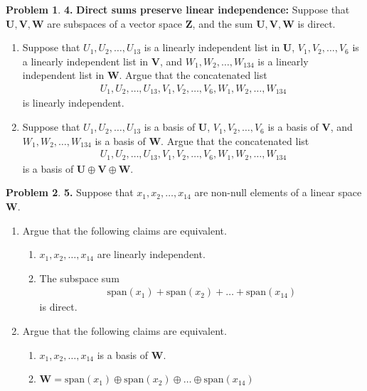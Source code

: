 \documentclass{article}
\theoremstyle{definition}
\newtheorem*{prob*}{Problem}
\newcommand{\V}{\mathbf{V}}
\newcommand{\W}{\mathbf{W}}
\newcommand{\Z}{\mathbf{Z}}
\newcommand{\U}{\mathbf{U}}
\newcommand{\xpan}{\text{span}}
\begin{document}
\begin{prob*} \textbf{4.} \textbf{Direct sums preserve linear independence:} Suppose that $\U,\V,\W$ are subspaces of a vector space $\Z$, and the sum $\U,\V,\W$ is direct. 
	\begin{enumerate}
		\item Suppose that $U_1,U_2,\dots,U_{13}$ is a linearly independent list in $\U$, $V_1,V_2,\dots,V_{6}$ is a linearly independent list in $\V$, and $W_1,W_2,\dots,W_{134}$ is a linearly independent list in $\W$. Argue that the concatenated list 
		\begin{align*}
		U_1,U_2,\dots,U_{13},V_1,V_2,\dots,V_{6},W_1,W_2,\dots,W_{134}
		\end{align*}
		is linearly independent. 
		\item Suppose that $U_1,U_2,\dots,U_{13}$ is a basis of $\U$, $V_1,V_2,\dots,V_{6}$ is a basis of $\V$, and $W_1,W_2,\dots,W_{134}$ is a basis of $\W$. Argue that the concatenated list
		\begin{align*}
		U_1,U_2,\dots,U_{13},V_1,V_2,\dots,V_{6},W_1,W_2,\dots,W_{134}
		\end{align*}
		is a basis of $\U \oplus \V \oplus \W$.
	\end{enumerate}

\end{prob*}


\newpage




\begin{prob*} \textbf{5.} Suppose that $x_1, x_2,\dots,x_{14}$ are non-null elements of a linear space $\W$. 
	\begin{enumerate}
		\item Argue that the following claims are equivalent. 
		\begin{enumerate}
			\item $x_1, x_2,\dots,x_{14}$ are linearly independent. 
			\item The subspace sum 
			\begin{align*}
			\xpan(x_1) + \xpan(x_2) + \dots + \xpan(x_{14})
			\end{align*}
			is direct. 
		\end{enumerate}
		\item Argue that the following claims are equivalent.
		\begin{enumerate}
			\item $x_1, x_2,\dots,x_{14}$  is a basis of $\W$.
			\item $\W = \xpan(x_1) \oplus \xpan(x_2) \oplus \dots \oplus \xpan(x_{14})$
		\end{enumerate}
	\end{enumerate}


\end{prob*}
\end{document}
